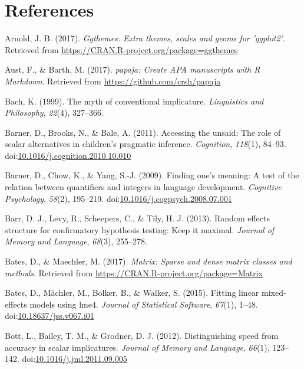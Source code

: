 \documentclass[mask,man]{apa6}
\begin{document}
\newpage

\section{References}\label{references}

\setlength{\parindent}{-0.5in} \setlength{\leftskip}{0.5in}

\hypertarget{refs}{}
\hypertarget{ref-R-ggthemes}{}
Arnold, J. B. (2017). \emph{Ggthemes: Extra themes, scales and geoms for
'ggplot2'}. Retrieved from
\url{https://CRAN.R-project.org/package=ggthemes}

\hypertarget{ref-R-papaja}{}
Aust, F., \& Barth, M. (2017). \emph{papaja: Create APA manuscripts with
R Markdown}. Retrieved from \url{https://github.com/crsh/papaja}

\hypertarget{ref-bach1999}{}
Bach, K. (1999). The myth of conventional implicature. \emph{Linguistics
and Philosophy}, \emph{22}(4), 327--366.

\hypertarget{ref-barner2011}{}
Barner, D., Brooks, N., \& Bale, A. (2011). Accessing the unsaid: The
role of scalar alternatives in children's pragmatic inference.
\emph{Cognition}, \emph{118}(1), 84--93.
doi:\href{https://doi.org/10.1016/j.cognition.2010.10.010}{10.1016/j.cognition.2010.10.010}

\hypertarget{ref-barner2009}{}
Barner, D., Chow, K., \& Yang, S.-J. (2009). Finding one's meaning: A
test of the relation between quantifiers and integers in language
development. \emph{Cognitive Psychology}, \emph{58}(2), 195--219.
doi:\href{https://doi.org/10.1016/j.cogpsych.2008.07.001}{10.1016/j.cogpsych.2008.07.001}

\hypertarget{ref-barr2013random}{}
Barr, D. J., Levy, R., Scheepers, C., \& Tily, H. J. (2013). Random
effects structure for confirmatory hypothesis testing: Keep it maximal.
\emph{Journal of Memory and Language}, \emph{68}(3), 255--278.

\hypertarget{ref-R-Matrix}{}
Bates, D., \& Maechler, M. (2017). \emph{Matrix: Sparse and dense matrix
classes and methods}. Retrieved from
\url{https://CRAN.R-project.org/package=Matrix}

\hypertarget{ref-R-lme4}{}
Bates, D., Mächler, M., Bolker, B., \& Walker, S. (2015). Fitting linear
mixed-effects models using lme4. \emph{Journal of Statistical Software},
\emph{67}(1), 1--48.
doi:\href{https://doi.org/10.18637/jss.v067.i01}{10.18637/jss.v067.i01}

\hypertarget{ref-bott2012}{}
Bott, L., Bailey, T. M., \& Grodner, D. J. (2012). Distinguishing speed
from accuracy in scalar implicatures. \emph{Journal of Memory and
Language}, \emph{66}(1), 123--142.
doi:\href{https://doi.org/10.1016/j.jml.2011.09.005}{10.1016/j.jml.2011.09.005}
\end{document}
